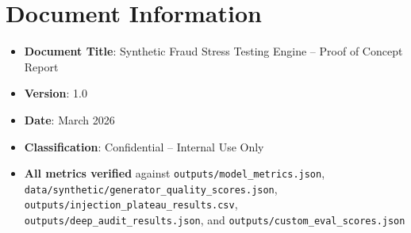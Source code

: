 \documentclass[12pt,a4paper,oneside]{book}
\begin{document}
\vfill

\section*{Document Information}
\begin{itemize}
    \small
    \item \textbf{Document Title}: Synthetic Fraud Stress Testing Engine -- Proof of Concept Report
    \item \textbf{Version}: 1.0
    \item \textbf{Date}: March 2026
    \item \textbf{Classification}: Confidential -- Internal Use Only
    \item \textbf{All metrics verified} against \texttt{outputs/model\_metrics.json}, \texttt{data/synthetic/generator\_quality\_scores.json}, \texttt{outputs/injection\_plateau\_results.csv}, \texttt{outputs/deep\_audit\_results.json}, and \texttt{outputs/custom\_eval\_scores.json}
\end{itemize}

\end{document}

